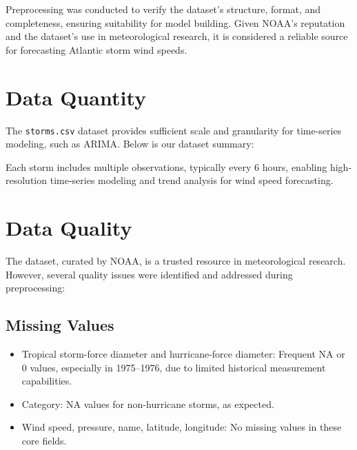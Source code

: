 Preprocessing was conducted to verify the dataset’s structure, format, and completeness, ensuring suitability for model building. Given NOAA’s reputation and the dataset’s use in meteorological research, it is considered a reliable source for forecasting Atlantic storm wind speeds.

\section{Data Quantity}
The \texttt{storms.csv} dataset provides sufficient scale and granularity for time-series modeling, such as ARIMA. Below is our dataset summary:\\


Each storm includes multiple observations, typically every 6 hours, enabling high-resolution time-series modeling and trend analysis for wind speed forecasting.

\section{Data Quality}
The dataset, curated by NOAA, is a trusted resource in meteorological research. However, several quality issues were identified and addressed during preprocessing:

\subsection{Missing Values}
\begin{itemize}
	\item Tropical storm-force diameter and hurricane-force diameter: Frequent NA or 0 values, especially in 1975--1976, due to limited historical measurement capabilities.
	\item Category: NA values for non-hurricane storms, as expected.
	\item Wind speed, pressure, name, latitude, longitude: No missing values in these core fields.
\end{itemize}

